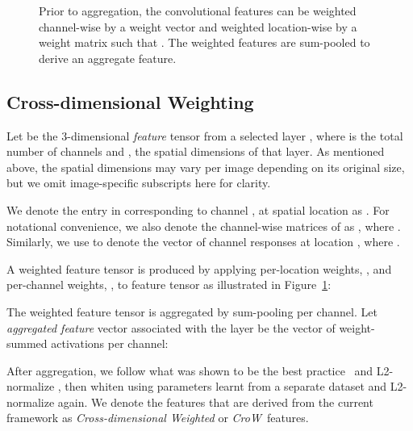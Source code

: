\documentclass[runningheads]{llncs}
\newcommand{\CroW}{\textit{CroW}~} \newcommand{\Crow}{\CroW}
\begin{document}
\begin{figure}[t]

\caption{Prior to aggregation, the convolutional features can be weighted channel-wise by a weight vector  and weighted location-wise by a weight matrix  such that . The weighted features  are sum-pooled to derive an aggregate feature.}
\label{fig:feature_weighting}
\end{figure} 



\subsection{Cross-dimensional Weighting}

Let  be the 3-dimensional \textit{feature} tensor from a selected layer , where  is the total number of channels and ,  the spatial dimensions of that layer. As mentioned above, the spatial dimensions may vary per image depending on its original size, but we omit image-specific subscripts here for clarity. 


We denote the entry in  corresponding to channel , at spatial location  as . For notational convenience, we also denote the channel-wise matrices of  as , where . Similarly, we use  to denote the vector of channel responses at location , where .

A weighted feature tensor  is produced by applying per-location weights, , and per-channel weights, , to feature tensor  as illustrated in Figure~\ref{fig:feature_weighting}:




The weighted feature tensor is aggregated by sum-pooling per channel. Let \textit{aggregated feature} vector  associated with the layer  be the vector of weight-summed activations per channel:



After aggregation, we follow what was shown to be the best practice~\cite{RASC14, ARS+14} and L2-normalize , then whiten using parameters learnt from a separate dataset and L2-normalize again.
We denote the features that are derived from the current framework as \textit{Cross-dimensional Weighted} or \CroW features.
\end{document}
